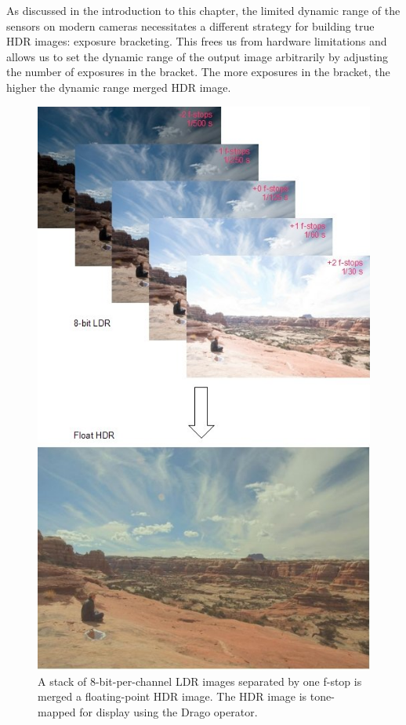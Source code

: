 As discussed in the introduction to this chapter, the limited dynamic
range of the sensors on modern cameras necessitates a different
strategy for building true HDR images: exposure bracketing.  This frees
us from hardware limitations and allows us to set the dynamic range of
the output image arbitrarily by adjusting the number of exposures in
the bracket.  The more exposures in the bracket, the higher the
dynamic range merged HDR image.

\begin{figure}[tbp]
\begin{center}
  \includegraphics[width=5in]{images/hdr_merge.jpg}
 \end{center}
  \caption{A stack of 8-bit-per-channel LDR images separated by one
    f-stop is merged a floating-point HDR image. The HDR image is
    tone-mapped for display using the Drago operator.}
  \label{fig:hdrmerge}
\end{figure}

